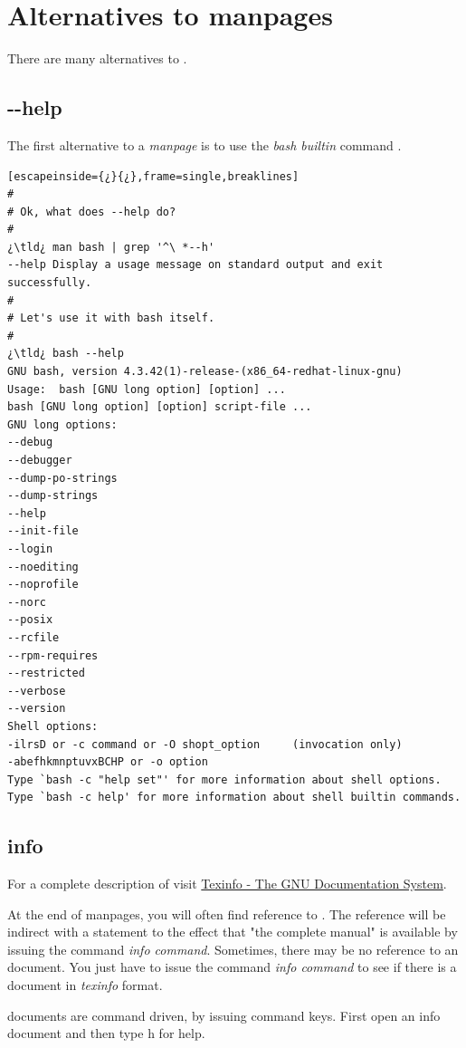 \section{Alternatives to manpages}

There are many alternatives to .

\subsection{-{}-{}help}

The first alternative to a \emph{manpage} is to use the \emph{bash builtin} command .

\begin{lstlisting}[escapeinside={¿}{¿},frame=single,breaklines]
#
# Ok, what does --help do?
#
¿\tld¿ man bash | grep '^\ *--h'
--help Display a usage message on standard output and exit successfully.
#
# Let's use it with bash itself.
#
¿\tld¿ bash --help
GNU bash, version 4.3.42(1)-release-(x86_64-redhat-linux-gnu)
Usage:	bash [GNU long option] [option] ...
bash [GNU long option] [option] script-file ...
GNU long options:
--debug
--debugger
--dump-po-strings
--dump-strings
--help
--init-file
--login
--noediting
--noprofile
--norc
--posix
--rcfile
--rpm-requires
--restricted
--verbose
--version
Shell options:
-ilrsD or -c command or -O shopt_option		(invocation only)
-abefhkmnptuvxBCHP or -o option
Type `bash -c "help set"' for more information about shell options.
Type `bash -c help' for more information about shell builtin commands.

\end{lstlisting}

\subsection{info}

For a complete description of  visit \href{https://www.gnu.org/software/texinfo/}{Texinfo - The GNU Documentation System}.

At the end of manpages, you will often find reference to . The reference will be indirect with a statement to the effect that "the complete manual" is available by issuing the command \emph{info command}. Sometimes, there may be no reference to an  document. You just have to issue the command \emph{info command} to see if there is a document in \emph{texinfo} format.

 documents are command driven, by issuing command keys. First open an info document and then type h for help.

